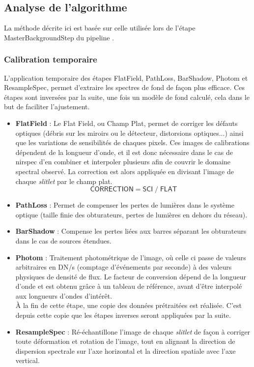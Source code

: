 \documentclass[12pt, a4paper]{article}
\begin{document}
\subsection{Analyse de l'algorithme}

La méthode décrite ici est basée sur celle utilisée lors de l'étape MasterBackgroundStep du pipeline .

\subsubsection{Calibration temporaire}

L'application temporaire des étapes FlatField, PathLoss, BarShadow, Photom et ResampleSpec, permet d'extraire les spectres de fond de façon plus efficace. Ces étapes sont inversées par la suite, une fois un modèle de fond calculé, cela dans le but de faciliter l'ajustement.

\begin{itemize}
  \item \textbf{FlatField} : Le Flat Field, ou Champ Plat, permet de corriger les défauts optiques (débris sur les miroirs ou le détecteur, distorsions optiques...) ainsi que les variations de sensibilités de chaques pixels. Ces images de calibrations dépendent de la longueur d'onde, et il est donc nécessaire dans le cas de \gls{nirspec} d'en combiner et interpoler plusieurs afin de couvrir le domaine spectral observé. La correction est alors appliquée en divisant l'image de chaque \textit{slitlet} par le champ plat.
  \begin{equation}
    \mathsf{CORRECTION} = \mathsf{SCI} \; / \; \mathsf{FLAT} 
  \end{equation}

  \item \textbf{PathLoss} : Permet de compenser les pertes de lumières dans le système optique (taille finie des obturateurs, pertes de lumières en dehors du réseau).
  
  \item \textbf{BarShadow} : Compense les pertes liées aux barres séparant les obturateurs dans le cas de sources étendues.
  
  \item \textbf{Photom} : Traitement photométrique de l'image, où celle ci passe de valeurs arbitraires en DN/s (comptage d'événements par seconde) à des valeurs physiques de densité de flux. Le facteur de conversion dépend de la longueur d'onde et est obtenu grâce à un tableau de référence, avant d'être interpolé aux longueurs d'ondes d'intérêt.\\
  
  À la fin de cette étape, une copie des données prétraitées est réalisée. C'est depuis cette copie que les étapes inverses seront appliquées par la suite.
  
  \item \textbf{ResampleSpec} : Ré-échantillone l'image de chaque \textit{slitlet} de façon à corriger toute déformation et rotation de l'image, tout en alignant la direction de dispersion spectrale sur l'axe horizontal et la direction spatiale avec l'axe vertical.
\end{itemize}
\end{document}
